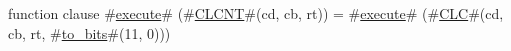 function clause #\hyperref[zexecute]{execute}# (#\hyperref[zCLCNT]{CLCNT}#(cd, cb, rt)) =
{
  #\hyperref[zexecute]{execute}# (#\hyperref[zCLC]{CLC}#(cd, cb, rt, #\hyperref[ztozybits]{to\_bits}#(11, 0)))
}
